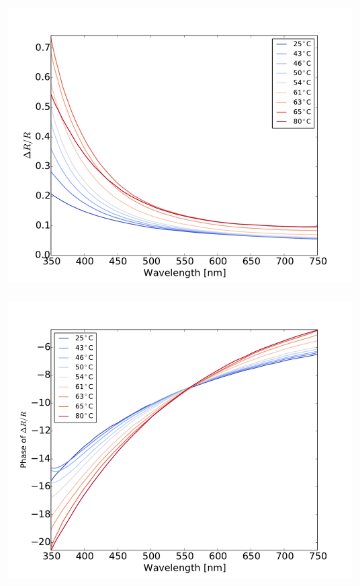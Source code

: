 \begin{figure}
    \centering
    \begin{subfigure}[b]{0.3\textwidth}
        \centering
        \includegraphics[width=\textwidth]{Results/Sim4/dR_visible.pdf}
        \caption{}
    \end{subfigure}
    \begin{subfigure}[b]{0.3\textwidth}
        \centering
        \includegraphics[width=\textwidth]{Results/Sim4/dRphase_visible.pdf}
        \caption{}
    \end{subfigure}

\end{figure}
